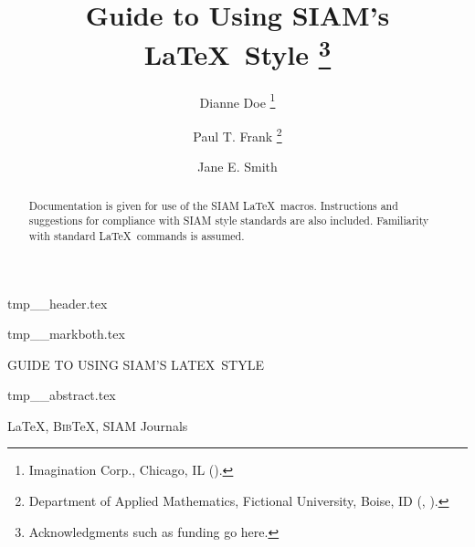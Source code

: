 \documentclass[]{siamart}
\newcommand{\BibTeX}{{\scshape Bib}\TeX\xspace}
\begin{document}
\begin{tcbverbatimwrite}{tmp_\jobname_header.tex}
\title{Guide to Using SIAM's \LaTeX\ Style%
  \thanks{Acknowledgments such as funding go here.}}

\author{Dianne Doe%
  \thanks{Imagination Corp., Chicago, IL ().}%
  \and
  Paul T. Frank%
  \thanks{Department of Applied Mathematics, Fictional University, Boise, ID
    (, ).}
  \and
  Jane E. Smith%
  \footnotemark[3]
}

\maketitle

\end{tcbverbatimwrite}


\begin{tcbverbatimwrite}{tmp_\jobname_markboth.tex}
\pagestyle{myheadings}
\thispagestyle{plain}
%
{\MakeUppercase{\siampretitle\@ Guide to Using  SIAM'S \LaTeX\ Style}}
\end{tcbverbatimwrite}




\begin{tcbverbatimwrite}{tmp_\jobname_abstract.tex}
\begin{abstract}
  Documentation is given for use of the SIAM \LaTeX\ macros.
  Instructions and suggestions for compliance with SIAM style
  standards are also included. Familiarity with standard \LaTeX\
  commands is assumed.
\end{abstract}

\begin{keywords}
  \LaTeX, \BibTeX, SIAM Journals 
\end{keywords}

\begin{AMS}
\end{AMS}
\end{tcbverbatimwrite}

\end{document}
